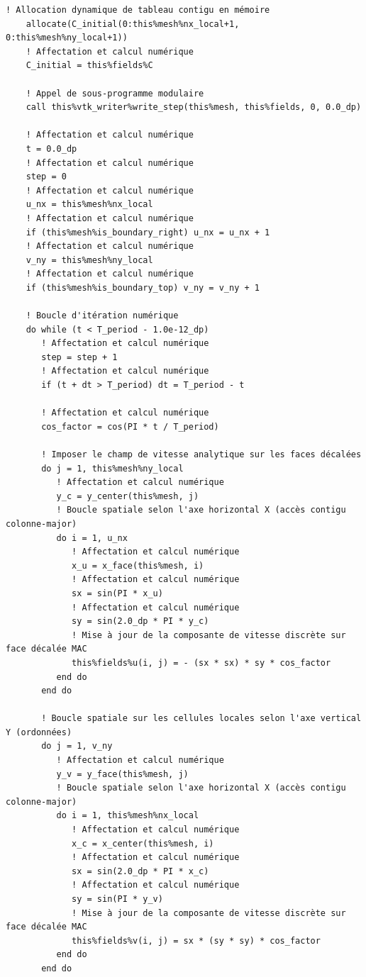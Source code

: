 \documentclass[10pt,a4paper,oneside]{book}
\begin{document}
\begin{lstlisting}[language={[95]Fortran}]
    ! Allocation dynamique de tableau contigu en mémoire
    allocate(C_initial(0:this%mesh%nx_local+1, 0:this%mesh%ny_local+1))
    ! Affectation et calcul numérique
    C_initial = this%fields%C

    ! Appel de sous-programme modulaire
    call this%vtk_writer%write_step(this%mesh, this%fields, 0, 0.0_dp)

    ! Affectation et calcul numérique
    t = 0.0_dp
    ! Affectation et calcul numérique
    step = 0
    ! Affectation et calcul numérique
    u_nx = this%mesh%nx_local
    ! Affectation et calcul numérique
    if (this%mesh%is_boundary_right) u_nx = u_nx + 1
    ! Affectation et calcul numérique
    v_ny = this%mesh%ny_local
    ! Affectation et calcul numérique
    if (this%mesh%is_boundary_top) v_ny = v_ny + 1

    ! Boucle d'itération numérique
    do while (t < T_period - 1.0e-12_dp)
       ! Affectation et calcul numérique
       step = step + 1
       ! Affectation et calcul numérique
       if (t + dt > T_period) dt = T_period - t

       ! Affectation et calcul numérique
       cos_factor = cos(PI * t / T_period)

       ! Imposer le champ de vitesse analytique sur les faces décalées
       do j = 1, this%mesh%ny_local
          ! Affectation et calcul numérique
          y_c = y_center(this%mesh, j)
          ! Boucle spatiale selon l'axe horizontal X (accès contigu colonne-major)
          do i = 1, u_nx
             ! Affectation et calcul numérique
             x_u = x_face(this%mesh, i)
             ! Affectation et calcul numérique
             sx = sin(PI * x_u)
             ! Affectation et calcul numérique
             sy = sin(2.0_dp * PI * y_c)
             ! Mise à jour de la composante de vitesse discrète sur face décalée MAC
             this%fields%u(i, j) = - (sx * sx) * sy * cos_factor
          end do
       end do

       ! Boucle spatiale sur les cellules locales selon l'axe vertical Y (ordonnées)
       do j = 1, v_ny
          ! Affectation et calcul numérique
          y_v = y_face(this%mesh, j)
          ! Boucle spatiale selon l'axe horizontal X (accès contigu colonne-major)
          do i = 1, this%mesh%nx_local
             ! Affectation et calcul numérique
             x_c = x_center(this%mesh, i)
             ! Affectation et calcul numérique
             sx = sin(2.0_dp * PI * x_c)
             ! Affectation et calcul numérique
             sy = sin(PI * y_v)
             ! Mise à jour de la composante de vitesse discrète sur face décalée MAC
             this%fields%v(i, j) = sx * (sy * sy) * cos_factor
          end do
       end do


\end{lstlisting}
\end{document}
